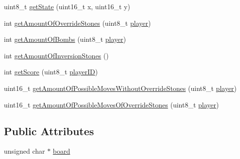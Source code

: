 \begin{DoxyCompactItemize}
\item 
uint8\+\_\+t \hyperlink{class_map_a87a052481c8ae80549a32dd2b1a44a2a}{get\+State} (uint16\+\_\+t x, uint16\+\_\+t y)
\item 
int \hyperlink{class_map_a9b6079e40f0d165bbbeb162d6cad6bdd}{get\+Amount\+Of\+Override\+Stones} (uint8\+\_\+t \hyperlink{_reversi_a_i_8cpp_ae41164029686cac80f7f6bd7aa23b153}{player})
\item 
int \hyperlink{class_map_a4fb209e05e6de9d2cc11ca3314b4a9b1}{get\+Amount\+Of\+Bombs} (uint8\+\_\+t \hyperlink{_reversi_a_i_8cpp_ae41164029686cac80f7f6bd7aa23b153}{player})
\item 
int \hyperlink{class_map_a38aa61dae9e8b6dd53c4e562550a0b92}{get\+Amount\+Of\+Inversion\+Stones} ()
\item 
int \hyperlink{class_map_a141fa561d897b3e7149cda991dba24fa}{get\+Score} (uint8\+\_\+t \hyperlink{algorithms_8cpp_a197db7ad117c560f318c1da8cef96fec}{player\+ID})
\item 
uint16\+\_\+t \hyperlink{class_map_a945bd3265621780f76f7210e9867bc15}{get\+Amount\+Of\+Possible\+Moves\+Without\+Override\+Stones} (uint8\+\_\+t \hyperlink{_reversi_a_i_8cpp_ae41164029686cac80f7f6bd7aa23b153}{player})
\item 
uint16\+\_\+t \hyperlink{class_map_a686ce8911d05a1517c5ff5ca98afe41b}{get\+Amount\+Of\+Possible\+Moves\+Of\+Override\+Stones} (uint8\+\_\+t \hyperlink{_reversi_a_i_8cpp_ae41164029686cac80f7f6bd7aa23b153}{player})
\end{DoxyCompactItemize}
\subsection*{Public Attributes}
\begin{DoxyCompactItemize}
\item 
unsigned char $\ast$ \hyperlink{class_map_a028873ce7275713d88fdafd18d427e82}{board}
\end{DoxyCompactItemize}
